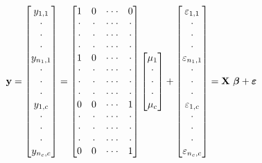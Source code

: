 \begin{equation}\label{E4:MatrixOneFactor}
\mathbf{y}=%
\begin{bmatrix}
y_{1,1} \\
\cdot  \\
\cdot  \\
\cdot  \\
y_{n_1,1} \\
\cdot  \\
\cdot  \\
\cdot  \\
y_{1,c} \\
\cdot  \\
\cdot  \\
\cdot  \\
y_{n_{c},c}%
\end{bmatrix}%
=%
\begin{bmatrix}
1 & 0 & \cdot \cdot \cdot  & 0 \\
\cdot  & \cdot  & \cdot \cdot \cdot  & \cdot  \\
\cdot  & \cdot  & \cdot \cdot \cdot  & \cdot  \\
\cdot  & \cdot  & \cdot \cdot \cdot  & \cdot  \\
1 & 0 & \cdot \cdot \cdot  & \cdot  \\
\cdot  & \cdot  & \cdot \cdot \cdot  & \cdot  \\
\cdot  & \cdot  & \cdot \cdot \cdot  & \cdot  \\
\cdot  & \cdot  & \cdot \cdot \cdot  & \cdot  \\
0 & 0 & \cdot \cdot \cdot  & 1 \\
\cdot  & \cdot  & \cdot \cdot \cdot  & \cdot  \\
\cdot  & \cdot  & \cdot \cdot \cdot  & \cdot  \\
\cdot  & \cdot  & \cdot \cdot \cdot  & \cdot  \\
0 & 0 & \cdot \cdot \cdot  & 1%
\end{bmatrix}%
\begin{bmatrix}
\mu_1 \\
\cdot  \\
\cdot  \\
\cdot  \\
\mu_c%
\end{bmatrix}%
+%
\begin{bmatrix}
\varepsilon_{1,1} \\
\cdot  \\
\cdot  \\
\cdot  \\
\varepsilon_{n_1,1} \\
\cdot  \\
\cdot  \\
\cdot  \\
\varepsilon_{1,c} \\
\cdot  \\
\cdot  \\
\cdot  \\
\varepsilon_{n_{c},c}%
\end{bmatrix}%
=\mathbf{X\ \boldsymbol \beta + \boldsymbol \varepsilon} \text{\ \ \
\ }
\end{equation}




